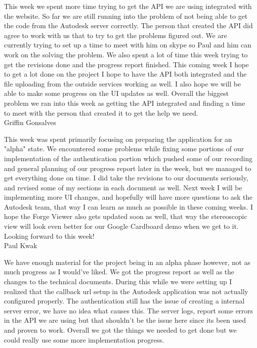 \documentclass[letterpaper, 10pt, draftclsnofoot, compsoc, onecolumn]{IEEEtran}
\begin{document}
This week we spent more time trying to get the API we are using integrated with the website. So far we are still running into the problem of not being able to get the code from the Autodesk server correctly. The person that created the API did agree to work with us that to try to get the problems figured out. We are currently trying to set up a time to meet with him on skype so Paul and him can work on the solving the problem. We also spent a lot of time this week trying to get the revisions done and the progress report finished. This coming week I hope to get a lot done on the project I hope to have the API both integrated and the file uploading from the outside services working as well. I also hope we will be able to make some progress on the UI updates as well. Overall the biggest problem we ran into this week as getting the API integrated and finding a time to meet with the person that created it to get the help we need.\\

Griffin Gonsalves

This week was spent primarily focusing on preparing the application for an "alpha" state. We encountered some problems while fixing some portions of our implementation of the authentication portion which pushed some of our recording and general planning of our progress report later in the week, but we managed to get everything done on time. I did take the revisions to our documents seriously, and revised some of my sections in each document as well. Next week I will be implementing more UI changes, and hopefully will have more questions to ask the Autodesk team, that way I can learn as much as possible in these coming weeks. I hope the Forge Viewer also gets updated soon as well, that way the stereoscopic view will look even better for our Google Cardboard demo when we get to it. Looking forward to this week!\\

Paul Kwak

We have enough material for the project being in an alpha phase however, not as much progress as I would've liked. We got the progress report as well as the changes to the technical documents. During this while we were setting up I realized that the callback url setup in the Autodesk application was not actually configured properly. The authentication still has the issue of creating a internal server error, we have no idea what causes this. The server logs, report some errors in the API we are using but that shouldn't be the issue here since its been used and proven to work. Overall we got the things we needed to get done but we could really use some more implementation progress.\\
\end{document}
